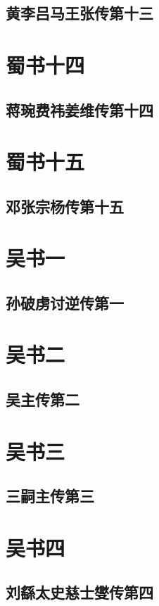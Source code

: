\documentclass[12pt,UTF8]{ctexbook}
\begin{document}
\chapter{黄李吕马王张传第十三}

\part{蜀书十四}
\chapter{蒋琬费祎姜维传第十四}

\part{蜀书十五}
\chapter{邓张宗杨传第十五}

\part{吴书一}
\chapter{孙破虏讨逆传第一}

\part{吴书二}
\chapter{吴主传第二}

\part{吴书三}
\chapter{三嗣主传第三}

\part{吴书四}
\chapter{刘繇太史慈士燮传第四}
\end{document}
